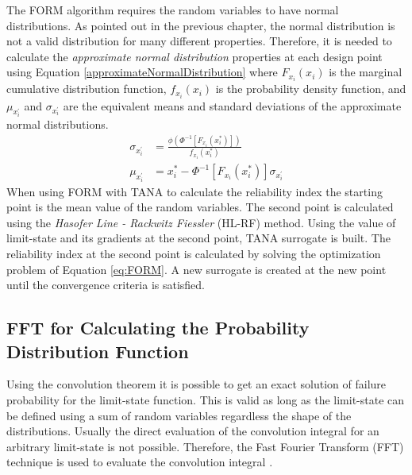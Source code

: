 \documentclass[paper=a4, fontsize=12pt]{scrartcl} %
\begin{document}
The FORM algorithm requires the random variables to have normal distributions. As pointed out in the previous chapter, the normal distribution is not a valid distribution for many different properties. Therefore, it is needed to calculate the \emph{approximate normal distribution} properties at each design point using Equation \eqref{approximateNormalDistribution} where $F_{x_i}\left( x_i \right)$ is the marginal cumulative distribution function, $f_{x_i}\left( x_i \right)$ is the probability density function, and $\mu_{x_i^\prime}$ and $\sigma_{x_i^\prime}$ are the equivalent means and standard deviations of the approximate normal distributions.
%
\begin{subequations}\label{approximateNormalDistribution}
\begin{align}
\sigma_{x_i^\prime} &= \frac{\phi \left( \Phi^{-1} \left[F_{x_i} \left(x_i^* \right) \right] \right)}{f_{x_i} \left( x_i^* \right)}
\\
\mu_{x_i^\prime} &= x_i^* - \Phi^{-1} \left[ F_{x_i} \left( x_i^* \right) \right] \sigma_{x_i^\prime}
\end{align}
\end{subequations}
%
When using FORM with TANA to calculate the reliability index the starting point is the mean value of the random variables. The second point is calculated using the \emph{Hasofer Line - Rackwitz Fiessler} (HL-RF) method. Using the value of limit-state and its gradients at the second point, TANA surrogate is built. The reliability index at the second point is calculated by solving the optimization problem of Equation \eqref{eq:FORM}. A new surrogate is created at the new point until the convergence criteria is satisfied.
\subsection{FFT for Calculating the Probability Distribution Function}
Using the convolution theorem it is possible to get an exact solution of failure probability for the limit-state function. This is valid as long as the limit-state can be defined using a sum of random variables regardless the shape of the distributions. Usually the direct evaluation of the convolution integral for an arbitrary limit-state is not possible. Therefore, the Fast Fourier Transform (FFT) technique is used to evaluate the convolution integral \cite{penmetsa2003adaptation}.\\
\end{document}
